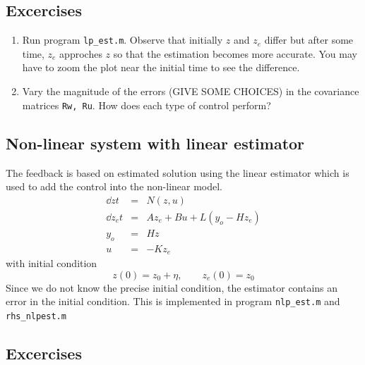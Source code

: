 \documentclass[12pt]{article}
\begin{document}
\subsection{Excercises}

\begin{enumerate}

\item Run program {\tt lp\_est.m}. Observe that initially $z$ and $z_e$ differ but after some time, $z_e$ approches $z$ so that the estimation becomes more accurate. You may have to zoom the plot near the initial time to see the difference.

\item Vary the magnitude of the errors (GIVE SOME CHOICES) in the covariance matrices {\tt Rw, Ru}. How does each type of control perform?
\end{enumerate}


\subsection{Non-linear system with linear estimator}

The feedback is based on estimated solution using the linear estimator which is used to add the control into the non-linear model.
\begin{eqnarray*}
\dd{z}{t} &=& N(z, u) \\
\dd{z_e}{t} &=& A z_e + B u + L(y_o - H z_e) \\
y_o &=& H z \\
u &=& -K z_e
\end{eqnarray*}
with initial condition
\[
z(0) = z_0 + \eta, \qquad z_e(0) = z_0
\]
Since we do not know the precise initial condition, the estimator contains an error in the initial condition. This is implemented in program {\tt nlp\_est.m} and {\tt rhs\_nlpest.m}

\subsection{Excercises}
\end{document}
